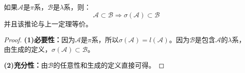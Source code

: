 \begin{corollary}\label{cor:SigmaPi=LambdaPi}
	如果$\mathscr{A}$是$\pi$系，$\mathscr{B}$是$\lambda$系，则：
	\begin{equation*}
		\mathscr{A}\subset \mathscr{B}\Rightarrow\sigma(\mathscr{A})\subset \mathscr{B}
	\end{equation*}
	并且该推论与上一定理等价。
\end{corollary}
\begin{proof}
	\textbf{(1)必要性：}因为$\mathscr{A}$是$\pi$系，所以$\sigma(\mathscr{A})=l(\mathscr{A})$。因为$\mathscr{B}$是包含$\mathscr{A}$的$\lambda$系，由生成的定义，$\sigma(\mathscr{A})\subset \mathscr{B}$。\par
	\textbf{(2)充分性：}由$\mathscr{B}$的任意性和生成的定义直接可得。
\end{proof}

